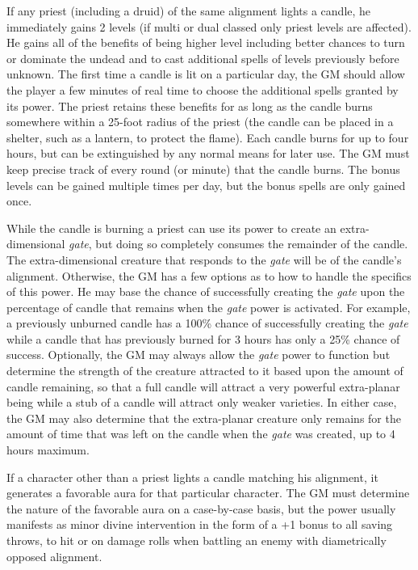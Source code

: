 \begin{multicols}{2}
If any priest (including a druid) of the same alignment lights a candle, he immediately gains 2 levels (if multi or dual classed only priest levels are affected).  He gains all of the benefits of being higher level including better chances to turn or dominate the undead and to cast additional spells of levels previously before unknown.  The first time a candle is lit on a particular day, the GM should allow the player a few minutes of real time to choose the additional spells granted by its power.  The priest retains these benefits for as long as the candle burns somewhere within a 25-foot radius of the priest (the candle can be placed in a shelter, such as a lantern, to protect the flame).  Each candle burns for up to four hours, but can be extinguished by any normal means for later use.  The GM must keep precise track of every round (or minute) that the candle burns.  The bonus levels can be gained multiple times per day, but the bonus spells are only gained once. 

While the candle is burning a priest can use its power to create an extra-dimensional \textit{gate}, but doing so completely consumes the remainder of the candle.  The extra-dimensional creature that responds to the \textit{gate} will be of the candle's alignment.  Otherwise, the GM has a few options as to how to handle the specifics of this power.  He may base the chance of successfully creating the \textit{gate} upon the percentage of candle that remains when the \textit{gate} power is activated.  For example, a previously unburned candle has a 100\% chance of successfully creating the \textit{gate} while a candle that has previously burned for 3 hours has only a 25\% chance of success.  Optionally, the GM may always allow the \textit{gate} power to function but determine the strength of the creature attracted to it based upon the amount of candle remaining, so that a full candle will attract a very powerful extra-planar being while a stub of a candle will attract only weaker varieties.  In either case, the GM may also determine that the extra-planar creature only remains for the amount of time that was left on the candle when the \textit{gate} was created, up to 4 hours maximum.

If a character other than a priest lights a candle matching his alignment, it generates a favorable aura for that particular character.  The GM must determine the nature of the favorable aura on a case-by-case basis, but the power usually manifests as minor divine intervention in the form of a +1 bonus to all saving throws, to hit or on damage rolls when battling an enemy with diametrically opposed alignment.


\end{multicols}
